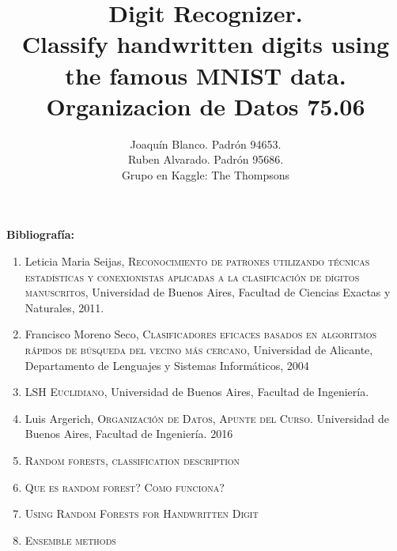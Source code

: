 \documentclass[a4paper,11pt]{report}
\title{Digit Recognizer. \\ 
  Classify handwritten digits using the famous MNIST data.\\
  Organizacion de Datos 75.06}
\author{Joaquín Blanco. Padrón 94653.\\
  Ruben Alvarado. Padrón 95686.\\
  Grupo en Kaggle: The Thompsons}
\begin{document}
\maketitle
\tableofcontents






\textbf{Bibliografía:}
\begin{enumerate}
  \item Leticia Maria Seijas, \textsc{Reconocimiento de patrones utilizando técnicas estadísticas y conexionistas aplicadas a la clasificación de dígitos manuscritos}, Universidad de Buenos Aires, Facultad de Ciencias Exactas y Naturales, 2011.
  \item Francisco Moreno Seco, \textsc{Clasificadores eficaces basados en algoritmos rápidos de búsqueda del vecino más cercano}, Universidad de Alicante, Departamento de Lenguajes y Sistemas Informáticos, 2004
  \item \textsc{LSH Euclidiano}, Universidad de Buenos Aires, Facultad de Ingeniería.
  \item Luis Argerich, \textsc{Organización de Datos, Apunte del Curso.} Universidad de Buenos Aires, Facultad de Ingeniería. 2016
  \item \textsc{Random forests, classification description} 
  \item \textsc{Que es random forest? Como funciona?}
  \item \textsc{Using Random Forests for Handwritten Digit}
  \item \textsc{Ensemble methods  }
\end{enumerate}
\end{document}
